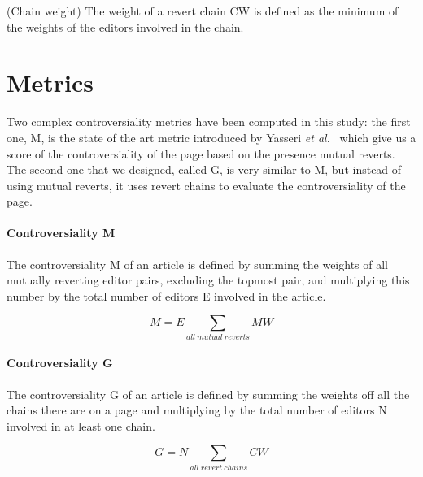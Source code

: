 \begin{Definition}
    (Chain weight) The weight of a revert chain CW is defined as the minimum of the weights of the editors involved in the chain.
\end{Definition}


\section{Metrics}
Two complex controversiality metrics have been computed in this study: the first one, M, is the state of the
art metric introduced by Yasseri \textit{et al.}~\cite{Yasseri2014} which give us a score of the controversiality of the page
based on the presence mutual reverts. The second one that we designed, called G, is very similar to M, but
instead of using mutual reverts, it uses revert chains to evaluate the controversiality of the page.  

\paragraph*{Controversiality M}
The controversiality M of an article is defined by summing the weights of all mutually reverting
editor pairs, excluding the topmost pair, and multiplying this number by the total number of editors
E involved in the article.

\begin{equation}
    M = E   \sum_{all\ mutual\ reverts} MW
\end{equation}

\paragraph*{Controversiality G}
The controversiality G of an article is defined by summing the weights off all the chains
there are on a page and multiplying by the total number of editors N involved in at least one chain.

\begin{equation}
    G = N \sum_{all\ revert\ chains} CW
\end{equation}





